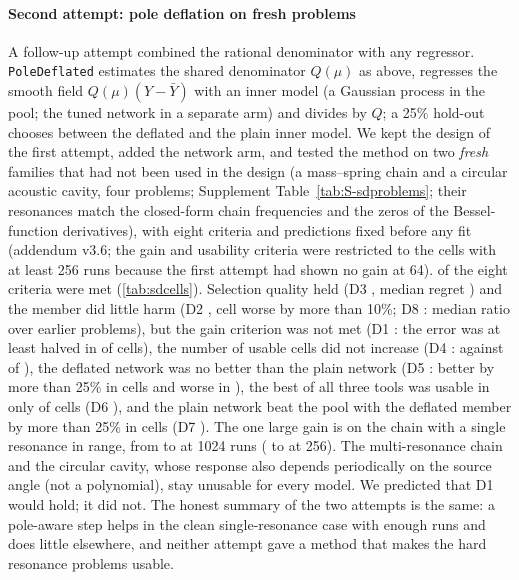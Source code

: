 \paragraph{Second attempt: pole deflation on fresh problems} A follow-up attempt combined the rational denominator with any regressor. \texttt{PoleDeflated} estimates the shared denominator $Q(\mu)$ as above, regresses the smooth field $Q(\mu)(Y-\bar Y)$ with an inner model (a Gaussian process in the pool; the tuned network in a separate arm) and divides by $Q$; a 25\% hold-out chooses between the deflated and the plain inner model. We kept the design of the first attempt, added the network arm, and tested the method on two \emph{fresh} families that had not been used in the design (a mass--spring chain and a circular acoustic cavity, four problems; Supplement Table~\ref{tab:S-sdproblems}; their resonances match the closed-form chain frequencies and the zeros of the Bessel-function derivatives), with eight criteria and predictions fixed before any fit (addendum v3.6; the gain and usability criteria were restricted to the \SdFourN{} cells with at least 256 runs because the first attempt had shown no gain at 64). \SdMetCount{} of the eight criteria were met (\cref{tab:sdcells}). Selection quality held (D3 \SdThreeVerdict, median regret \SdThreeMedian) and the member did little harm (D2 \SdTwoVerdict, \SdTwoWorse{} cell worse by more than 10\%; D8 \SdEightVerdict: median ratio \SdEightMedian{} over \SdEightN{} earlier problems), but the gain criterion was not met (D1 \SdOneVerdict: the error was at least halved in \SdOneK{} of \SdOneN{} cells), the number of usable cells did not increase (D4 \SdFourVerdict: \SdFourNew{} against \SdFourOld{} of \SdFourN), the deflated network was no better than the plain network (D5 \SdFiveVerdict: better by more than 25\% in \SdFiveBetter{} cells and worse in \SdFiveWorse), the best of all three tools was usable in only \SdSixBest{} of \SdFourN{} cells (D6 \SdSixVerdict), and the plain network beat the pool with the deflated member by more than 25\% in \SdSevenK{} cells (D7 \SdSevenVerdict). The one large gain is on the chain with a single resonance in range, from \SdChainOld{} to \SdChainNew{} at 1024 runs (\SdChainTwoFiveSixOld{} to \SdChainTwoFiveSixNew{} at 256). The multi-resonance chain and the circular cavity, whose response also depends periodically on the source angle (not a polynomial), stay unusable for every model. We predicted that D1 would hold; it did not. The honest summary of the two attempts is the same: a pole-aware step helps in the clean single-resonance case with enough runs and does little elsewhere, and neither attempt gave a method that makes the hard resonance problems usable.
\begin{table}[t]\centering\caption{Fresh frequency-response problems: test error (geometric mean over three seeds) of the model selected by the tool with the old pool and with the pole-deflated member, of the plain tuned network and of the pole-deflated tuned network.}\label{tab:sdcells}\small\resizebox{\textwidth}{!}{}\end{table}
